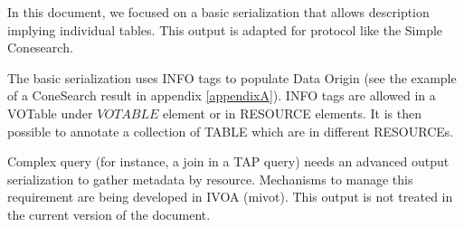 \documentclass[11pt,a4paper]{ivoa}
\begin{document}
In this document, we focused on a basic serialization that allows description implying individual tables.
This output is adapted for protocol like the Simple Conesearch.

The basic serialization uses INFO tags to populate Data Origin (see the example of a ConeSearch result in appendix  \ref{appendixA}).
INFO tags are allowed in a VOTable under $VOTABLE$ element or in RESOURCE elements.
It is then possible to annotate a collection of TABLE which are in different RESOURCEs.


Complex query (for instance, a join in a TAP query) needs an advanced output serialization to gather metadata by resource. 
Mechanisms to manage this requirement are being developed in IVOA (mivot). 
This output is not treated in the current version of the document. 



%
%
%
%
%
\end{document}
